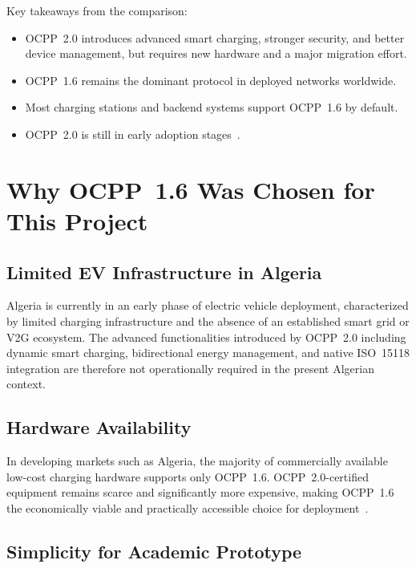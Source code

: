 \documentclass[12pt,a4paper]{report}
\begin{document}
Key takeaways from the comparison:
\begin{itemize}
  \item OCPP~2.0 introduces advanced smart charging, stronger security, and better device
        management, but requires new hardware and a major migration effort.
  \item OCPP~1.6 remains the dominant protocol in deployed networks worldwide.
  \item Most charging stations and backend systems support OCPP~1.6 by default.
  \item OCPP~2.0 is still in early adoption stages~\autocite{iea_ev_outlook_2024}.
\end{itemize}

\section{Why OCPP~1.6 Was Chosen for This Project}

\subsection{Limited EV Infrastructure in Algeria}

Algeria is currently in an early phase of electric vehicle deployment, characterized by limited
charging infrastructure and the absence of an established smart grid or V2G ecosystem. The
advanced functionalities introduced by OCPP~2.0 including dynamic smart charging, bidirectional
energy management, and native ISO~15118 integration are therefore not operationally required
in the present Algerian context.

\subsection{Hardware Availability}

In developing markets such as Algeria, the majority of commercially available low-cost charging
hardware supports only OCPP~1.6. OCPP~2.0-certified equipment remains scarce and significantly
more expensive, making OCPP~1.6 the economically viable and practically accessible choice for
deployment~\autocite{luxman2024}.

\subsection{Simplicity for Academic Prototype}
\end{document}
